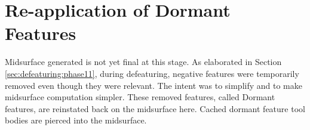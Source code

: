 \begin{center}
\begin{longtable}[!htb]{@{}p{\myColWidthFactora\linewidth} p{\myColWidthFactora\linewidth}  p{\myColWidthFactora\linewidth}  p{\myColWidthFactora\linewidth} @{}}
\bottomrule
\end{longtable}
\end{center}




\section{Re-application of Dormant Features}

Midsurface generated is not yet final at this stage. As elaborated in Section \ref{sec:defeaturing:phase11}, during defeaturing, negative features were temporarily removed even though they were relevant. The intent was to simplify and to make midsurface computation simpler. These removed features, called Dormant features, are reinstated back on the midsurface here. Cached dormant feature tool bodies are pierced into the midsurface.




